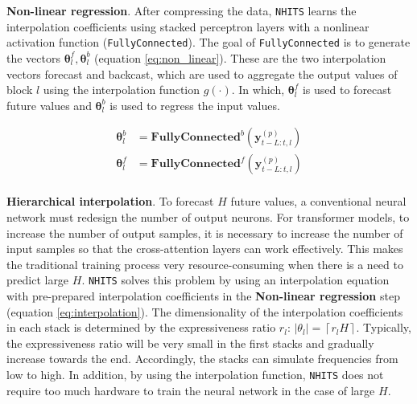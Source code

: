 \textbf{Non-linear regression}. After compressing the data, \verb|NHITS| learns the interpolation coefficients using stacked perceptron layers with a nonlinear activation function (\verb|FullyConnected|). The goal of \verb|FullyConnected| is to generate the vectors $\mathbf{\theta}_l^f, \mathbf{\theta}_l^b$ (equation \ref{eq:non_linear}). These are the two interpolation vectors forecast and backcast, which are used to aggregate the output values of block $l$ using the interpolation function $g(\cdot)$. In which, $\mathbf{\theta}_l^f$ is used to forecast future values and $\mathbf{\theta}_l^b$ is used to regress the input values.

\begin{align}
    \mathbf{\theta}_l^b &= \mathbf{FullyConnected}^b \left( \mathbf{y}_{t-L:t, l}^{(p)} \right)\\
    \mathbf{\theta}_l^f &= \mathbf{FullyConnected}^f \left( \mathbf{y}_{t-L:t, l}^{(p)} \right)\\
    \label{eq:non_linear}
\end{align}


\textbf{Hierarchical interpolation}. To forecast $H$ future values, a conventional neural network must redesign the number of output neurons. For transformer models, to increase the number of output samples, it is necessary to increase the number of input samples so that the cross-attention layers can work effectively. This makes the traditional training process very resource-consuming when there is a need to predict large $H$. \verb|NHITS| solves this problem by using an interpolation equation with pre-prepared interpolation coefficients in the \textbf{Non-linear regression} step (equation \ref{eq:interpolation}). The dimensionality of the interpolation coefficients in each stack is determined by the expressiveness ratio $r_l$: $\left| \theta_l \right| = \left \lceil r_l H \right \rceil$. Typically, the expressiveness ratio will be very small in the first stacks and gradually increase towards the end. Accordingly, the stacks can simulate frequencies from low to high. In addition, by using the interpolation function, \verb|NHITS| does not require too much hardware to train the neural network in the case of large $H$.

